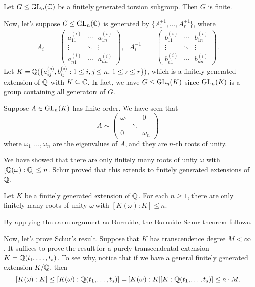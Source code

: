 \begin{theo}{}
    Let $G \leq \operatorname{GL}_n(\mathbb{C})$ be a finitely generated torsion subgroup. Then 
    $G$ is finite. 
\end{theo}

Now, let's suppose $G \leq \operatorname{GL}_n(\mathbb{C})$ is generated by $\{A_1^{\pm1}, \dots, 
A_r^{\pm1}\}$, where 
\begin{align*}
    A_i &= \begin{pmatrix}
        a_{11}^{(i)} & \cdots & a_{1n}^{(i)} \\ 
        \vdots & \ddots & \vdots \\ 
        a_{n1}^{(i)} & \cdots & a_{nn}^{(i)}
    \end{pmatrix}, & A_i^{-1} &= \begin{pmatrix}
        b_{11}^{(i)} & \cdots & b_{1n}^{(i)} \\ 
        \vdots & \ddots & \vdots \\ 
        b_{n1}^{(i)} & \cdots & b_{nn}^{(i)}
    \end{pmatrix}. 
\end{align*}
Let $K = \mathbb{Q}(\{a_{ij}^{(s)}, b_{ij}^{(s)} : 1 \leq i, j \leq n,\, 1 \leq s \leq r
\})$, which is a finitely generated extension of $\mathbb{Q}$ with $K \subseteq \mathbb{C}$. 
In fact, we have $G \leq \operatorname{GL}_n(K)$ since $\operatorname{GL}_n(K)$ is a group containing all 
generators of $G$. 

Suppose $A \in \operatorname{GL}_n(K)$ has finite order. We have seen that 
\[ A \sim \begin{pmatrix}
    \omega_1 & & 0 \\ 
    & \ddots & \\ 
    0 & & \omega_n
\end{pmatrix} \] 
where $\omega_1, \dots, \omega_n$ are the eigenvalues of $A$, and they are 
$n$-th roots of unity. 

We have showed that there are only finitely many roots of unity $\omega$ with 
$[\mathbb{Q}(\omega) : \mathbb{Q}] \leq n$. Schur proved that this extends to finitely 
generated extensions of $\mathbb{Q}$. 

\begin{theo}[Schur]{}
    Let $K$ be a finitely generated extension of $\mathbb{Q}$. For each $n \geq 1$, 
    there are only finitely many roots of unity $\omega$ with $[K(\omega) : K] \leq n$. 
\end{theo}

By applying the same argument as Burnside, the Burnside-Schur theorem follows. 

Now, let's prove Schur's result. Suppose that $K$ has transcendence degree 
$M < \infty$. It suffices to prove the result for a purely transcendental 
extension $K = \mathbb{Q}(t_1, \dots, t_s)$. To see why, notice that if we 
have a general finitely generated extension $K/\mathbb{Q}$, then 
\[ [K(\omega) : K] \leq [K(\omega) : \mathbb{Q}(t_1, \dots, t_s)] = 
[K(\omega) : K][K : \mathbb{Q}(t_1, \dots, t_s)] \leq n\cdot M. \] 

